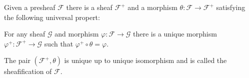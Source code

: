 Given a presheaf $\mathcal{F}$ there is a sheaf $\mathcal{F}^+$ and a morphism
$\theta\colon \mathcal{F}\to \mathcal{F}^+$ satisfying the following
universal propert:

For any sheaf $\mathcal{G}$ and morphism $\varphi\colon \mathcal{F}\to \mathcal{G}$
there is a unique morphism $\varphi^+\colon \mathcal{F}^+\to \mathcal{G}$ such
that $\varphi^+ \circ\theta = \varphi$.

The pair $(\mathcal{F}^+, \theta)$ is unique up to unique isomorphism and is called
the sheafification of $\mathcal{F}$.
